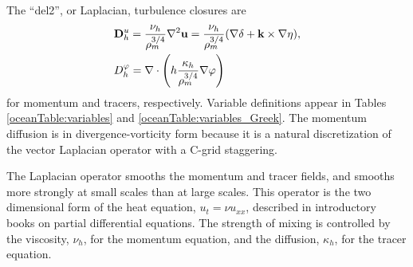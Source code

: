 The ``del2'', or Laplacian, turbulence closures are
\begin{eqnarray}
\label{ocean:h_mom_del2}
& {\bf D}^u_h=\displaystyle\frac{\nu_h}{\rho_m^{3/4}} \nabla^2 {\bf u} 
= \displaystyle\frac{\nu_h}{\rho_m^{3/4}}(\nabla \delta + {\bf 
k}\times \nabla \eta),\\
\label{ocean:h_tr_del2}
& D^\varphi_h = \nabla\cdot\left(h 
   \displaystyle\frac{\kappa_h}{\rho_m^{3/4}} \nabla\varphi \right)
\end{eqnarray}
for momentum and tracers, respectively.  Variable definitions appear in Tables \ref{oceanTable:variables} and \ref{oceanTable:variables_Greek}.  The momentum diffusion is in divergence-vorticity form because it is a natural discretization of the vector Laplacian operator with a C-grid staggering.  

The Laplacian operator smooths the momentum and 
tracer fields, and smooths more strongly at small scales than at large 
scales.  This operator is the two dimensional form of the heat equation, 
$u_t=\nu u_{xx}$, described in introductory books on partial 
differential equations.  The strength of mixing is controlled by the 
viscosity, $\nu_h$, for the momentum equation, and the diffusion, 
$\kappa_h$, for the tracer equation.
